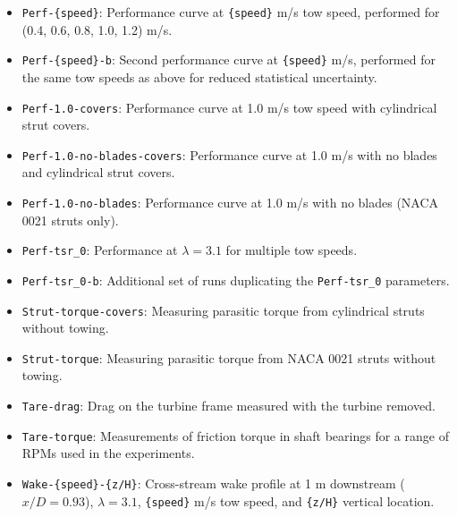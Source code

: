 \documentclass[10pt,letterpaper]{article}
\begin{document}
\begin{itemize}
    
    \item \texttt{Perf-\{speed\}}: Performance curve at \texttt{\{speed\}} m/s
    tow speed, performed for (0.4, 0.6, 0.8, 1.0, 1.2) m/s.
    
    \item \texttt{Perf-\{speed\}-b}: Second performance curve at
    \texttt{\{speed\}} m/s, performed for the same tow speeds as above for
    reduced statistical uncertainty.
    
    \item \texttt{Perf-1.0-covers}: Performance curve at 1.0 m/s tow speed with
    cylindrical strut covers.
    
    \item \texttt{Perf-1.0-no-blades-covers}: Performance curve at 1.0 m/s with
    no blades and cylindrical strut covers.
    
    \item \texttt{Perf-1.0-no-blades}: Performance curve at 1.0 m/s with no
    blades (NACA 0021 struts only).
    
    \item \texttt{Perf-tsr\_0}: Performance at $\lambda=3.1$ for multiple tow
    speeds.
    
    \item \texttt{Perf-tsr\_0-b}: Additional set of runs duplicating the
    \texttt{Perf-tsr\_0} parameters.
    
    \item \texttt{Strut-torque-covers}: Measuring parasitic torque from
    cylindrical struts without towing.
    
    \item \texttt{Strut-torque}: Measuring parasitic torque from
    NACA 0021 struts without towing.
    
    \item \texttt{Tare-drag}: Drag on the turbine frame measured with the turbine
    removed.
    
    \item \texttt{Tare-torque}: Measurements of friction torque in shaft
    bearings for a range of RPMs used in the experiments.
    
    \item \texttt{Wake-\{speed\}-\{z/H\}}: Cross-stream wake profile at 1 m
    downstream ($x/D=0.93$), $\lambda=3.1$, \texttt{\{speed\}} m/s tow speed,
    and \texttt{\{z/H\}} vertical location.
\end{itemize}
\end{document}
